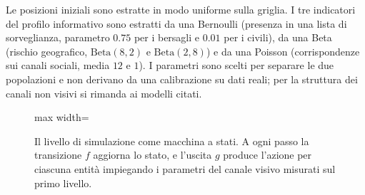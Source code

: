 \ifstampa\documentclass[a4paper,12pt,twoside,openright]{report}\else\documentclass[a4paper,12pt]{report}\fi
\newif\ifrevisione \revisionefalse
\DeclareRobustCommand{\rev}[1]{\ifrevisione{\color{blue!65!black}#1}\else#1\fi}
\begin{document}
{Le posizioni iniziali sono estratte in modo uniforme sulla griglia. I tre
indicatori del profilo informativo sono estratti da una Bernoulli (presenza in
una lista di sorveglianza, parametro $0.75$ per i bersagli e $0.01$ per i
civili), da una Beta (rischio geografico, $\mathrm{Beta}(8,2)$ e
$\mathrm{Beta}(2,8)$) e da una Poisson (corrispondenze sui canali sociali,
media $12$ e $1$). I parametri sono scelti per separare le due popolazioni e
non derivano da una calibrazione su dati reali; per la struttura dei canali
non visivi si rimanda ai modelli citati.

\begin{figure}[htbp]
\centering
\begin{adjustbox}{max width=\textwidth}
\end{adjustbox}
\caption[Il livello di simulazione come macchina a stati]{Il livello di
simulazione come macchina a stati. \rev{A ogni passo la transizione $f$ aggiorna lo
stato, e l'uscita $g$ produce l'azione per ciascuna entità impiegando i
parametri del canale visivo misurati sul primo livello.}}
\label{fig:automa}
\end{figure}}
\end{document}
